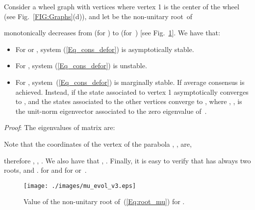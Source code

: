 \documentclass[letterpaper,9pt,twocolumn]{autart}
\begin{document}
\begin{proposition}
Consider a wheel graph  with  vertices where vertex 1 is the center of the wheel (see Fig.~\ref{FIG:Graphs}(d)),
and let  be the non-unitary root~of\vspace{-0.15cm}

 monotonically decreases from  (for ) to  (for~) [see Fig.~\ref{FIG:Root}].
We have that:
\begin{itemize}
\item For  or , system (\ref{Eq_cons_defor}) is asymptotically stable.
\item For , system (\ref{Eq_cons_defor}) is unstable.
\item For , system~(\ref{Eq_cons_defor}) is marginally
stable. If  average consensus is achieved. Instead, if 
the state associated to vertex 1 asymptotically converges to
, and the
states associated to the other  vertices converge to ,
where , , is
the unit-norm eigenvector associated to the zero eigenvalue of~.
\end{itemize}
\emph{Proof}:
The eigenvalues of matrix  are:

Note that the coordinates of the vertex of the
parabola , , are,

therefore , , .
We also have that , . Finally, it is easy to verify that  has always two roots,
 and .  for  and 
for  or~.~\hfill
\end{proposition}
\begin{figure}[t!]
       \begin{center}
           \texttt{[image: ./images/mu\_evol\_v3.eps]}
\caption{Value of the non-unitary root of~(\ref{Eq:root_mu}) for .}
           \label{FIG:Root}
       \end{center}
\end{figure}
\end{document}
